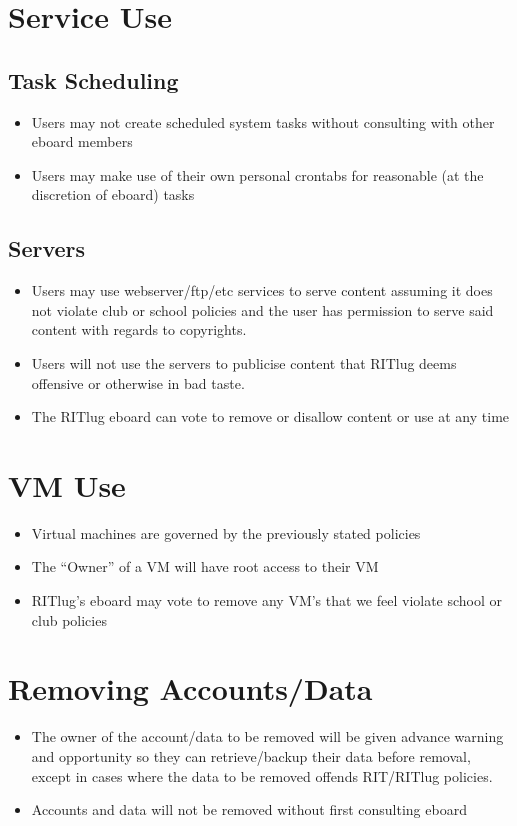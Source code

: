 \section{Service Use}

\subsection{Task Scheduling}
\begin{itemize}
\item Users may not create scheduled system tasks without consulting with other eboard members
\item Users may make use of their own personal crontabs for reasonable (at the discretion of eboard) tasks
\end{itemize}

\subsection{Servers}
\begin{itemize}
\item Users may use webserver/ftp/etc services to serve content assuming it does not violate club or school policies and the user has permission to serve said content with regards to copyrights.
\item Users will not use the servers to publicise content that RITlug deems offensive or otherwise in bad taste.
\item The RITlug eboard can vote to remove or disallow content or use at any time
\end{itemize}

\section{VM Use}
\begin{itemize}
\item Virtual machines are governed by the previously stated policies
\item The “Owner” of a VM will have root access to their VM
\item RITlug’s eboard may vote to remove any VM’s that we feel violate school or club policies
\end{itemize}

\section{Removing Accounts/Data}
\begin{itemize}
\item The owner of the account/data to be removed will be given advance warning and opportunity so they can retrieve/backup their data before removal, except in cases where the data to be removed offends RIT/RITlug policies.
\item Accounts and data will not be removed without first consulting eboard
\end{itemize}


